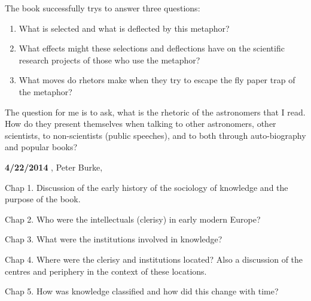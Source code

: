 The book successfully trys to answer three questions:
\begin{enumerate}
  \item What is selected and what is deflected by this metaphor?
  \item What effects might these selections and deflections have on the
scientific research projects of those who use the metaphor?
  \item What moves do rhetors make when they try to escape the fly
paper trap of the metaphor?
\end{enumerate}

The question for me is to ask, what is the rhetoric of the astronomers
that I read.  How do they present themselves when talking to other
astronomers, other scientists, to non-scientists (public speeches),
and to both through auto-biography and popular books?


{\bf 4/22/2014}
,
Peter Burke, \cite{Burke2000}

Chap 1. Discussion of the early history of the sociology of knowledge
and the purpose of the book.

Chap 2. Who were the intellectuals (clerisy) in early modern Europe?

Chap 3. What were the institutions involved in knowledge?

Chap 4. Where were the clerisy and institutions located? Also a discussion
of the centres and periphery in the context of these locations.

Chap 5. How was knowledge classified and how did this change with time?
